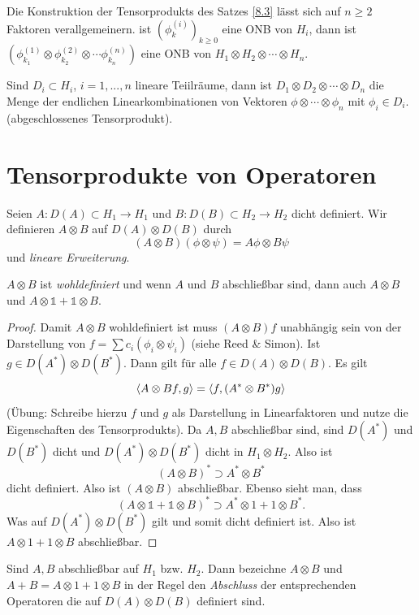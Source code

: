 \documentclass{mycourse}
\begin{document}
\begin{nt*}
Die Konstruktion der Tensorprodukts des Satzes \ref{8.3} lässt sich auf $n\ge 2$ Faktoren verallgemeinern. ist $(\phi_k^{(i)})_{k\ge 0}$ eine ONB von $H_i$, dann ist $(\phi^{(1)}_{k_1} \otimes \phi_{k_2}^{(2)} \otimes \cdots \phi_{k_n}^{(n)})$ eine ONB von $H_1 \otimes H_2 \otimes \cdots \otimes H_n$.
\end{nt*}
\begin{df}
Sind $D_i \subset H_i$, $i=1, ..., n$ lineare Teiilräume, dann ist $D_1 \otimes D_2 \otimes \cdots \otimes D_n$ die Menge der endlichen Linearkombinationen von Vektoren $\phi \otimes \cdots \otimes \phi_n$ mit $\phi_i \in D_i$. (abgeschlossenes Tensorprodukt).
\end{df}
\section{Tensorprodukte von Operatoren}
Seien $A: D(A)\subset H_1\to H_1$ und $B: D(B) \subset H_2 \to H_2$ dicht definiert. Wir definieren $A\otimes B$ auf $D(A) \otimes D(B)$ durch
\[
(A\otimes B) (\phi \otimes \psi) = A\phi \otimes B\psi
\]
und \emph{lineare Erweiterung}.
\begin{lem}
$A\otimes B$ ist \emph{wohldefiniert} und wenn $A$ und $B$ abschließbar sind, dann auch $A\otimes B$ und $A\otimes \mathbb 1 + \mathbb 1 \otimes B$.
\end{lem}
\begin{proof}
Damit $A\otimes B$ wohldefiniert ist muss $(A\otimes B) f$ unabhängig sein von der Darstellung von $f= \sum c_i (\phi_i \otimes \psi_i)$ (siehe Reed \& Simon). Ist $g\in D(A^*)\otimes D(B^*)$. Dann gilt für alle $f\in D(A) \otimes D(B)$. Es gilt
\[
\langle A\otimes B f, g\rangle = \langle f, (A^* \otimes B^*)g\rangle
\]
(Übung: Schreibe hierzu $f$ und $g$ als Darstellung in Linearfaktoren und nutze die Eigenschaften des Tensorprodukts). Da $A,B$ abschließbar sind, sind $D(A^*)$ und $D(B^*)$ dicht und $D(A^*) \otimes D(B^*)$ dicht in $H_1 \otimes H_2$. Also ist
\[
(A\otimes B)^* \supset A^* \otimes B^*
\]  
dicht definiert. Also ist $(A\otimes B)$ abschließbar. Ebenso sieht man, dass
\[
(A\otimes \mathbb 1+ \mathbb 1 \otimes B)^* \supset A^* \otimes 1 + 1 \otimes B^*.
\]
Was auf $D(A^*) \otimes D(B^*)$ gilt und somit dicht definiert ist. Also ist $A\otimes 1 + 1\otimes B$ abschließbar.
\end{proof}

Sind $A,B$ abschließbar auf $H_1$ bzw. $H_2$. Dann bezeichne $A\otimes B$ und $A+B = A\otimes 1 + 1 \otimes B$ in der Regel den \emph{Abschluss} der entsprechenden Operatoren die auf $D(A) \otimes D(B)$ definiert sind. 
\end{document}
